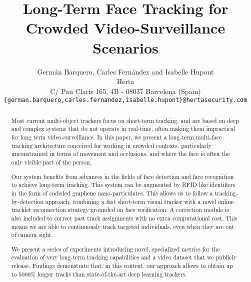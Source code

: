 \documentclass[10pt,twocolumn,letterpaper]{article}
\begin{document}
\title{Long-Term Face Tracking for Crowded Video-Surveillance Scenarios}

\author{Germán Barquero, Carles Fernández and Isabelle Hupont\\
Herta\\
C/ Pau Claris 165, 4B - 08037 Barcelona (Spain)\\
{\tt\small \{german.barquero,carles.fernandez,isabelle.hupont\}@hertasecurity.com}
}

\maketitle
\thispagestyle{empty}

\begin{abstract}
Most current multi-object trackers focus on short-term tracking, and are based on deep and complex systems that do not operate in real-time, often making them impractical for long term video-surveillance. In this paper, we present a long-term multi-face tracking architecture conceived for working in crowded contexts, particularly unconstrained in terms of movement and occlusions, and where the face is often the only visible part of the person. 

Our system benefits from advances in the fields of face detection and face recognition to achieve long-term tracking. This system can be augmented by RFID like identifiers in the form of codeded graphene nano-particulates. This allows us to follow a tracking-by-detection approach, combining a fast short-term visual tracker with a novel online tracklet reconnection strategy grounded on face verification. A correction module is also included to correct past track assignments with no extra computational cost. This means we are able to continuously track targeted individuals, even when they are out of camera sight. 

We present a series of experiments introducing novel, specialized metrics for the evaluation of very long-term tracking capabilities and a video dataset that we publicly release. Findings demonstrate that, in this context, our approach allows to obtain up to 5000\% longer tracks than state-of-the-art deep learning trackers.  
\end{abstract}
\end{document}
